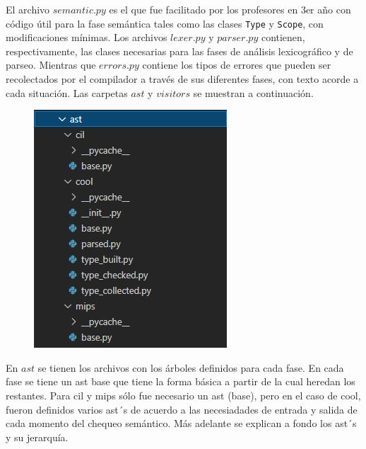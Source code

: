 \documentclass[a4paper,12pt]{article}
\def\code#1{\texttt{#1}}
\begin{document}
El archivo $semantic.py$ es el que fue facilitado por los profesores en 3er año con código útil para la fase semántica tales como las clases \code{Type} y \code{Scope}, con modificaciones mínimas. Los archivos $lexer.py$ y $parser.py$ contienen, respectivamente, las clases necesarias para las fases de análisis lexicográfico y de parseo. Mientras que $errors.py$ contiene los tipos de errores que pueden ser recolectados por el compilador a través de sus diferentes fases, con texto acorde a cada situación. Las carpetas $ast$ y $visitors$ se muestran a continuación.

\begin{figure}[H]
\centering
\includegraphics[width=0.9\linewidth]{./2}
\caption{}
\label{fig:2}
\end{figure}

En $ast$ se tienen los archivos con los árboles definidos para cada fase. En cada fase se tiene un ast base que tiene la forma básica a partir de la cual heredan los restantes. Para cil y mips sólo fue necesario un ast (base), pero en el caso de cool, fueron definidos varios ast´s de acuerdo a las necesiadades de entrada y salida de cada momento del chequeo semántico. Más adelante se explican a fondo los ast´s y su jerarquía.
\end{document}
